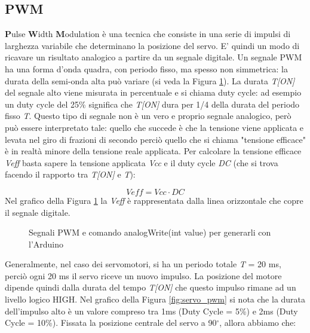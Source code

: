 \documentclass[12pt]{report}
\begin{document}
%
\subsection{PWM}
%

\textbf{P}ulse \textbf{W}idth \textbf{M}odulation è una tecnica che consiste in una serie di impulsi di larghezza variabile che determinano la posizione del servo. E' quindi un modo di ricavare un risultato analogico a partire da un segnale digitale. Un segnale PWM ha una forma d'onda quadra, con periodo fisso, ma spesso non simmetrica: la durata della semi-onda alta può variare (si veda la Figura \ref{fig:pwm}). La durata \textit{T[ON]} del segnale alto viene misurata in percentuale e si chiama duty cycle: ad esempio un duty cycle del 25\% significa che \textit{T[ON]} dura per 1/4 della durata del periodo fisso \textit{T}. Questo tipo di segnale non è un vero e proprio segnale analogico, però può essere interpretato tale: quello che succede è che la tensione viene applicata e levata nel giro di frazioni di secondo perciò quello che si chiama "tensione efficace" è in realtà minore della tensione reale applicata. Per calcolare la tensione efficace \textit{Veff} basta sapere la tensione applicata \textit{Vcc} e il duty cycle \textit{DC} (che si trova facendo il rapporto tra \textit{T[ON]} e \textit{T}):

%
\[Veff = Vcc \cdot DC\]
%
Nel grafico della Figura \ref{fig:pwm} la \textit{Veff} è rappresentata dalla linea orizzontale che copre il segnale digitale.

\begin{figure}
	\caption{Segnali PWM e comando analogWrite(int value) per generarli con l'Arduino}
	\label{fig:pwm}
\end{figure}

Generalmente, nel caso dei servomotori, si ha un periodo totale \textit{T} = 20 ms, perciò ogni 20 ms il servo riceve un nuovo impulso. La posizione del motore dipende quindi dalla durata del tempo \textit{T[ON]} che questo impulso rimane ad un livello logico HIGH. Nel grafico della Figura \ref{fig:servo_pwm} si nota che la durata dell'impulso alto è un valore compreso tra 1ms (Duty Cycle = 5\%) e 2ms (Duty Cycle = 10\%). Fissata la posizione centrale del servo a 90$^{\circ}$, allora abbiamo che: 
\end{document}
